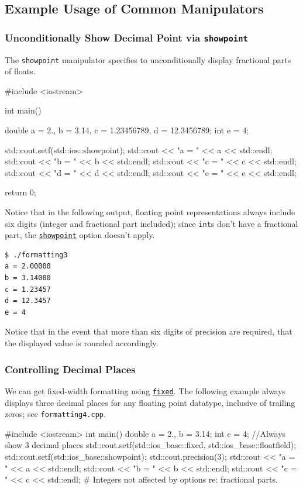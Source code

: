 \documentclass[12pt,letterpaper,twoside]{article}
\begin{document}
\subsection{Example Usage of Common Manipulators}
\subsubsection{Unconditionally Show Decimal Point via \texttt{showpoint}}
The \texttt{showpoint} manipulator specifies to unconditionally display fractional parts 
of floats.

\begin{cpp}
#include <iostream>

int main() {
  double a = 2., b = 3.14, c = 1.23456789, d = 12.3456789;
  int e = 4;

  std::cout.setf(std::ios::showpoint);
  std::cout << "a = " << a << std::endl;
  std::cout << "b = " << b << std::endl;
  std::cout << "c = " << c << std::endl;
  std::cout << "d = " << d << std::endl;
  std::cout << "e = " << e << std::endl;

  return 0;
}
\end{cpp}

Notice that in the following output, floating point representations always include six 
digits (integer and fractional part included); since \texttt{int}s don't have a fractional
part, the \href{https://en.cppreference.com/w/cpp/io/manip/showpoint}{\texttt{showpoint}} 
option doesn't apply.

\begin{verbatim}
$ ./formatting3
a = 2.00000 
b = 3.14000 
c = 1.23457 
d = 12.3457 
e = 4 \end{verbatim}

Notice that in the event that more than six digits of precision are required, that
the displayed value is rounded accordingly.

\subsubsection{Controlling Decimal Places}
We can get fixed-width formatting using 
\href{https://en.cppreference.com/w/cpp/io/manip/fixed}{\texttt{fixed}}. The following 
example always displays three decimal places for any floating point datatype, inclusive
of trailing zeros; see \texttt{formatting4.cpp}.

\begin{cpp}
#include <iostream>
int main() {
  double a = 2., b = 3.14;
  int c = 4;
  //Always show 3 decimal places
  std::cout.setf(std::ios_base::fixed, std::ios_base::floatfield);
  std::cout.setf(std::ios_base::showpoint);
  std::cout.precision(3);
  std::cout << "a = " << a << std::endl;
  std::cout << "b = " << b << std::endl;
  std::cout << "c = " << c << std::endl;  # Integers not affected by options re: fractional parts.
}
\end{cpp}
\end{document}

